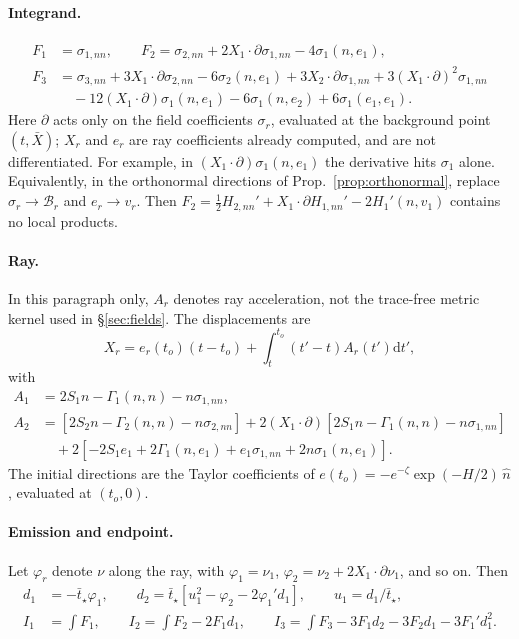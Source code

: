 \documentclass[11pt]{article}
\theoremstyle{definition}
\theoremstyle{remark}
\newcommand{\nh}{\hat n}
\newcommand{\dd}{\mathrm{d}}
\begin{document}
\paragraph{Integrand.}
\begin{align*}
F_1&=\sigma_{1,nn},\qquad F_2=\sigma_{2,nn}+2X_1\!\cdot\!\partial\sigma_{1,nn}-4\sigma_1(n,e_1),\\
F_3&=\sigma_{3,nn}+3X_1\!\cdot\!\partial\sigma_{2,nn}-6\sigma_2(n,e_1)+3X_2\!\cdot\!\partial\sigma_{1,nn}+3(X_1\!\cdot\!\partial)^2\sigma_{1,nn}\\
&\quad-12(X_1\!\cdot\!\partial)\sigma_1(n,e_1)-6\sigma_1(n,e_2)+6\sigma_1(e_1,e_1).
\end{align*}
Here $\partial$ acts only on the field coefficients $\sigma_r$, evaluated at the background point
$(t,\bar X)$; $X_r$ and $e_r$ are ray coefficients already computed, and are not differentiated.
For example, in $(X_1\cdot\partial)\sigma_1(n,e_1)$ the derivative hits $\sigma_1$ alone.
Equivalently, in the orthonormal directions of Prop.~\ref{prop:orthonormal}, replace
$\sigma_r\to\mathcal B_r$ and $e_r\to v_r$. Then
$F_2=\frac12H_{2,nn}'+X_1\cdot\partial H_{1,nn}'-2H_1'(n,v_1)$ contains no local products.

\paragraph{Ray.} In this paragraph only, $A_r$ denotes ray acceleration, not the
trace-free metric kernel used in \S\ref{sec:fields}. The displacements are
\[
X_r=e_r(t_o)(t-t_o)+\int_t^{t_o}(t'-t)A_r(t')\dd t',
\]
with
\begin{align*}
A_1&=2S_1n-\Gamma_1(n,n)-n\sigma_{1,nn},\\
A_2&=[2S_2n-\Gamma_2(n,n)-n\sigma_{2,nn}]+2(X_1\!\cdot\!\partial)[2S_1n-\Gamma_1(n,n)-n\sigma_{1,nn}]\\
&\quad+2[-2S_1e_1+2\Gamma_1(n,e_1)+e_1\sigma_{1,nn}+2n\sigma_1(n,e_1)].
\end{align*}
The initial directions are the Taylor coefficients of $e(t_o)=-e^{-\zeta}\exp(-H/2)\,\nh$,
evaluated at $(t_o,0)$.

\paragraph{Emission and endpoint.} Let $\varphi_r$ denote $\nu$ along the ray, with
$\varphi_1=\nu_1$, $\varphi_2=\nu_2+2X_1\cdot\partial\nu_1$, and so on. Then
\begin{align*}
d_1&=-\bar t_\star\varphi_1,\qquad
d_2=\bar t_\star[u_1^2-\varphi_2-2\varphi_1'd_1],\qquad u_1=d_1/\bar t_\star,\\
I_1&=\int F_1,\qquad I_2=\int F_2-2F_1d_1,\qquad I_3=\int F_3-3F_1d_2-3F_2d_1-3F_1'd_1^2 .
\end{align*}
\end{document}
